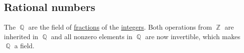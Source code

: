 \subsection{Rational numbers}\label{subsec:rational_numbers}

\begin{definition}\label{def:rational_numbers}
  The  \( \BbbQ \) are the field of \hyperref[def:field_of_fractions]{fractions} of the \hyperref[def:integers]{integers}. Both operations from \( \BbbZ \) are inherited in \( \BbbQ \) and all nonzero elements in \( \BbbQ \) are now invertible, which makes \( \BbbQ \) a field.
\end{definition}
